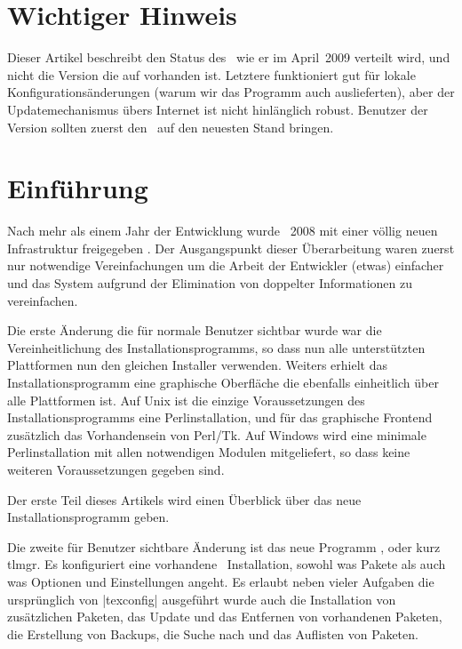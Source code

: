 \tableofcontents

\section*{Wichtiger Hinweis}

Dieser Artikel beschreibt den Status des \tlmgr\ wie er im April~2009
verteilt wird, und nicht die Version die auf  vorhanden ist.
Letztere funktioniert gut für lokale Konfigurationsänderungen
(warum wir das Programm auch auslieferten), aber der Updatemechanismus
übers Internet ist nicht hinlänglich robust. Benutzer der 
Version sollten zuerst den \tlmgr\ auf den neuesten Stand bringen.

\section{Einführung}
\label{sec:intro}

Nach mehr als einem Jahr der Entwicklung wurde \tl~2008 mit einer
völlig neuen Infrastruktur freigegeben \citep{at:2007-4-069-preining}.
Der Ausgangspunkt dieser Überarbeitung waren zuerst nur notwendige
Vereinfachungen um die Arbeit der Entwickler (etwas) einfacher und das
System aufgrund der Elimination von doppelter Informationen zu
vereinfachen.

Die erste Änderung die für normale Benutzer sichtbar wurde war die
Vereinheitlichung des Installationsprogramms, so dass nun alle
unterstützten Plattformen nun den gleichen Installer verwenden.
Weiters erhielt das Installationsprogramm eine graphische Oberfläche
die ebenfalls einheitlich über alle Plattformen ist. Auf Unix ist die
einzige Voraussetzungen des Installationsprogramms eine Perlinstallation,
und für das graphische Frontend zusätzlich das Vorhandensein von Perl/Tk.
Auf Windows wird eine minimale Perlinstallation mit allen notwendigen
Modulen mitgeliefert, so dass keine weiteren Voraussetzungen gegeben
sind.

Der erste Teil dieses Artikels wird einen Überblick über das 
neue Installationsprogramm geben.

Die zweite für Benutzer sichtbare Änderung ist das neue Programm \tlmgr,
oder kurz tlmgr. Es konfiguriert eine vorhandene \tl\ Installation, sowohl
was Pakete als auch was Optionen und Einstellungen angeht. Es erlaubt neben
vieler Aufgaben die ursprünglich von |texconfig| ausgeführt wurde auch die
Installation von zusätzlichen Paketen, das Update und das Entfernen von 
vorhandenen Paketen, die Erstellung von Backups, die Suche nach und das
Auflisten von Paketen.

